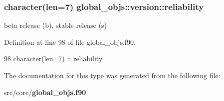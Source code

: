 \subsubsection[{reliability}]{\setlength{\rightskip}{0pt plus 5cm}character(len=7) global\+\_\+objs\+::version\+::reliability}\label{structglobal__objs_1_1version_ab73378e9664f22952fb5f0bdfafed956}


beta release (b), stable release (s) 



Definition at line 98 of file global\+\_\+objs.\+f90.


\begin{DoxyCode}
98     \textcolor{keywordtype}{character(len=7)} :: reliability
\end{DoxyCode}


The documentation for this type was generated from the following file\+:\begin{DoxyCompactItemize}
\item 
src/core/{\bf global\+\_\+objs.\+f90}\end{DoxyCompactItemize}
